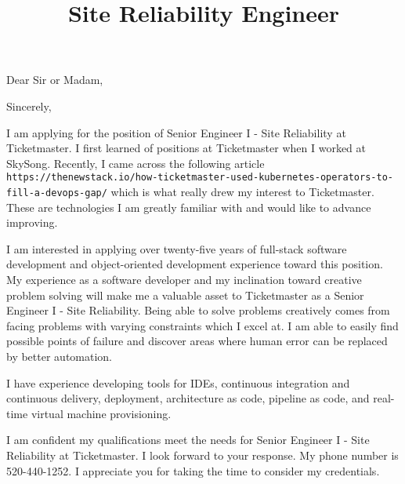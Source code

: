 \documentclass[11pt,a4paper,sans]{moderncv}        %
\title{Site Reliability Engineer}                               %
\begin{document}
\opening{Dear Sir or Madam,}
\closing{Sincerely,}
\makelettertitle


I am applying for the position of Senior Engineer I - Site Reliability at Ticketmaster. I first learned of positions at Ticketmaster when I worked at SkySong.
Recently, I came across the following article \texttt{https://thenewstack.io/how-ticketmaster-used-kubernetes-operators-to-fill-a-devops-gap/} which is what really drew
my interest to Ticketmaster. These are technologies I am greatly familiar with and would like to advance improving. 

I am interested in applying over twenty-five years of full-stack software development and object-oriented development experience toward this position.
My experience as a software developer and my inclination toward creative problem solving will make me a valuable asset to Ticketmaster as a Senior Engineer I - 
Site Reliability. Being able to solve problems creatively comes from facing problems with varying constraints which I excel at. I am able to easily find possible 
points of failure and discover areas where human error can be replaced by better automation.

I have experience developing tools for IDEs, continuous integration and continuous delivery, deployment, architecture as code, pipeline as code, and real-time virtual machine provisioning. 

I am confident my qualifications meet the needs for Senior Engineer I - Site Reliability at Ticketmaster. I look forward to your response. My phone number is 520-440-1252.
I appreciate you for taking the time to consider my credentials.


\makeletterclosing
\end{document}
